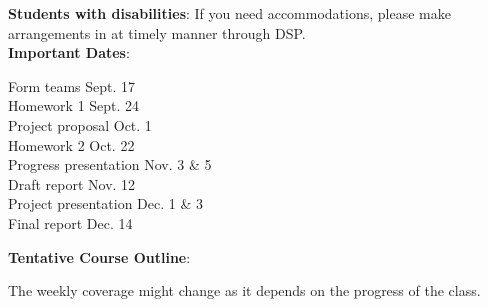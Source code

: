 \documentclass[11pt]{article}
\begin{document}
\textbf{Students with disabilities}: If you need accommodations, please make
arrangements in at timely manner through DSP.\\

\noindent\textbf{Important Dates}:
\begin{center} \begin{minipage}{5in}
\begin{flushleft}
Form teams \dotfill Sept. 17\\
Homework 1 \dotfill Sept. 24\\
Project proposal \dotfill Oct. 1\\
Homework 2 \dotfill Oct. 22\\
Progress presentation \dotfill Nov. 3 \& 5\\
Draft report \dotfill Nov. 12\\
Project presentation \dotfill Dec. 1 \& 3\\
Final report \dotfill Dec. 14\\
\end{flushleft}
\end{minipage}
\end{center}

\newpage

\textbf {\large Tentative Course Outline}:

The weekly coverage might change as it depends on the progress of the class.
\end{document}
